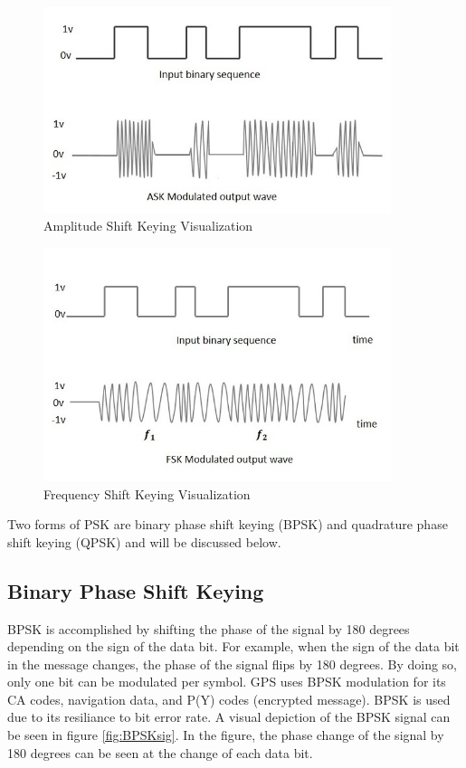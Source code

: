 \documentclass[12pt]{report}
\begin{document}
\begin{figure}[h]

    \centering
    \includegraphics[width=4.0in]{ask_modulated_waveform.jpg}
    \caption{Amplitude Shift Keying Visualization \cite{AmplitudeShiftKeying} }
    \label{fig:ASKsig}

\end{figure}

\begin{figure}[h]

    \centering
    \includegraphics[width=4.0in]{fsk_modulated_output_wave.jpg}
    \caption{Frequency Shift Keying Visualization \cite{FrequencyShiftKeying} }
    \label{fig:FSKsig}

\end{figure}

Two forms of PSK are binary phase shift keying (BPSK) and quadrature phase shift keying (QPSK) and will be discussed below.

\subsection{Binary Phase Shift Keying}

BPSK is accomplished by shifting the phase of the signal by 180 degrees depending on the sign of the data bit. For example, when the sign of the data bit in the message changes, the phase of the signal flips by 180 degrees. By doing so, only one bit can be modulated per symbol. GPS uses BPSK modulation for its CA codes, navigation data, and P(Y) codes (encrypted message). BPSK is used due to its resiliance to bit error rate. A visual depiction of the BPSK signal can be seen in figure \ref{fig:BPSKsig}. In the figure, the phase change of the signal by 180 degrees can be seen at the change of each data bit. 
\end{document}
